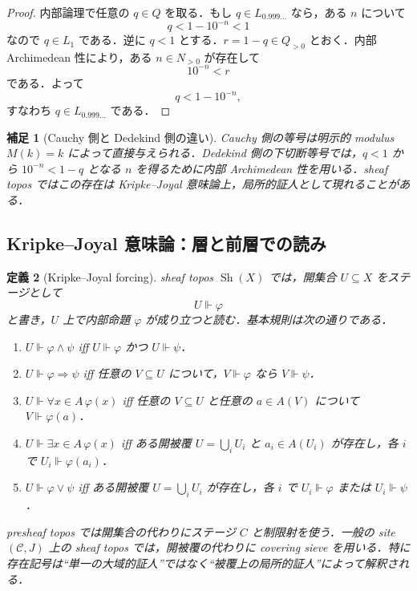 \documentclass[a4paper,11pt]{ltjsarticle}
\theoremstyle{jpdef}
\newtheorem{definition}{定義}[section]
\newtheorem{remark}[definition]{補足}
\theoremstyle{jpthm}
\newcommand{\Sh}{\operatorname{Sh}}
\begin{document}
\begin{proof}
内部論理で任意の \(q\in Q\) を取る．もし \(q\in L_{0.999\ldots}\) なら，ある \(n\) について
\[
  q<1-10^{-n}<1
\]
なので \(q\in L_1\) である．逆に \(q<1\) とする．\(r=1-q\in Q_{>0}\) とおく．内部 Archimedean 性により，ある \(n\in N_{>0}\) が存在して
\[
  10^{-n}<r
\]
である．よって
\[
  q<1-10^{-n},
\]
すなわち \(q\in L_{0.999\ldots}\) である．
\end{proof}

\begin{remark}[Cauchy 側と Dedekind 側の違い]
Cauchy 側の等号は明示的 modulus \(M(k)=k\) によって直接与えられる．Dedekind 側の下切断等号では，\(q<1\) から \(10^{-n}<1-q\) となる \(n\) を得るために内部 Archimedean 性を用いる．sheaf topos ではこの存在は Kripke--Joyal 意味論上，局所的証人として現れることがある．
\end{remark}

\subsection{Kripke--Joyal 意味論：層と前層での読み}

\begin{definition}[Kripke--Joyal forcing]
sheaf topos \(\Sh(X)\) では，開集合 \(U\subseteq X\) をステージとして
\[
  U\Vdash \varphi
\]
と書き，\(U\) 上で内部命題 \(\varphi\) が成り立つと読む．基本規則は次の通りである．
\begin{enumerate}
\item \(U\Vdash \varphi\land\psi\) iff \(U\Vdash\varphi\) かつ \(U\Vdash\psi\)．
\item \(U\Vdash \varphi\Rightarrow\psi\) iff 任意の \(V\subseteq U\) について，\(V\Vdash\varphi\) なら \(V\Vdash\psi\)．
\item \(U\Vdash \forall x\in A\,\varphi(x)\) iff 任意の \(V\subseteq U\) と任意の \(a\in A(V)\) について \(V\Vdash\varphi(a)\)．
\item \(U\Vdash \exists x\in A\,\varphi(x)\) iff ある開被覆 \(U=\bigcup_i U_i\) と \(a_i\in A(U_i)\) が存在し，各 \(i\) で \(U_i\Vdash\varphi(a_i)\)．
\item \(U\Vdash \varphi\lor\psi\) iff ある開被覆 \(U=\bigcup_i U_i\) が存在し，各 \(i\) で \(U_i\Vdash\varphi\) または \(U_i\Vdash\psi\)．
\end{enumerate}
presheaf topos では開集合の代わりにステージ \(C\) と制限射を使う．一般の site \((\mathcal C,J)\) 上の sheaf topos では，開被覆の代わりに covering sieve を用いる．特に存在記号は``単一の大域的証人''ではなく``被覆上の局所的証人''によって解釈される．
\end{definition}
\end{document}
